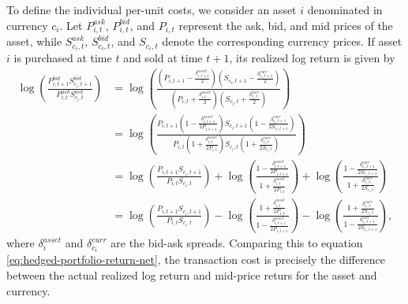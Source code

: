 To define the individual per-unit costs, we consider an asset $i$ denominated in currency $c_i$. Let $P^{ask}_{i,t}$, $P^{bid}_{i,t}$, and $P_{i,t}$ represent the ask, bid, and mid prices of the asset, while $S^{ask}_{c_i,t}$, $S^{bid}_{c_i,t}$, and $S_{c_i,t}$ denote the corresponding currency prices. If asset $i$ is purchased at time $t$ and sold at time $t+1$, its realized log return is given by
\begin{align*}
\log \left( \frac{P^{bid}_{i,t+1}S^{bid}_{c_i,t+1}}{P^{ask}_{i,t} S^{ask}_{c_i,t}} \right) 
&= \log \left( \frac{ \left( P_{i,t+1} - \frac{\delta^{asset}_{i,t+1}}{2} \right) \left( S_{c_i,t+1} - \frac{\delta^{curr}_{c_i,t+1}}{2} \right) }{ \left( P_{i,t} + \frac{\delta^{asset}_{i,t}}{2} \right) \left( S_{c_i,t} + \frac{\delta^{curr}_{c_i,t}}{2} \right) } \right) \\
&= \log \left( \frac{ P_{i,t+1} \left( 1 - \frac{\delta^{asset}_{i,t+1}}{2P_{i,t+1}} \right) S_{c_i,t+1} \left( 1 - \frac{\delta^{curr}_{c_i,t+1}}{2S_{c_i,t+1}} \right) }{ P_{i,t} \left( 1 + \frac{\delta^{asset}_{i,t}}{2P_{i,t}} \right) S_{c_i,t} \left( 1 + \frac{\delta^{curr}_{c_i,t}}{2S_{c_i,t}} \right) } \right) \\
&= \log \left( \frac{P_{i,t+1}S_{c_i,t+1}}{P_{i,t}S_{c_i,t}} \right) + \log \left( \frac{ 1 - \frac{\delta^{asset}_{i,t+1}}{2P_{i,t+1}} }{ 1 + \frac{\delta^{asset}_{i,t}}{2P_{i,t}} } \right) + \log \left( \frac{ 1 - \frac{\delta^{curr}_{c_i,t+1}}{2S_{c_i,t+1}} }{ 1 + \frac{\delta^{curr}_{c_i,t}}{2S_{c_i,t}} } \right) \\
&= \log \left( \frac{P_{i,t+1}S_{c_i,t+1}}{P_{i,t}S_{c_i,t}} \right) - \log \left( \frac{1 + \frac{\delta^{asset}_{i,t}}{2P_{i,t}}}{1 - \frac{\delta^{asset}_{i,t+1}}{2P_{i,t+1}}} \right) - \log \left( \frac{1 + \frac{\delta^{curr}_{c_i,t}}{2S_{c_i,t}}}{1 - \frac{\delta^{curr}_{c_i,t+1}}{2S_{c_i,t+1}}} \right),
\end{align*}
where $\delta^{asset}_{i}$ and $\delta^{curr}_{c_i}$ are the bid-ask spreads. Comparing this to equation \eqref{eq:hedged-portfolio-return-net}, the transaction cost is precisely the difference between the actual realized log return and mid-price returs for the asset and currency. 

